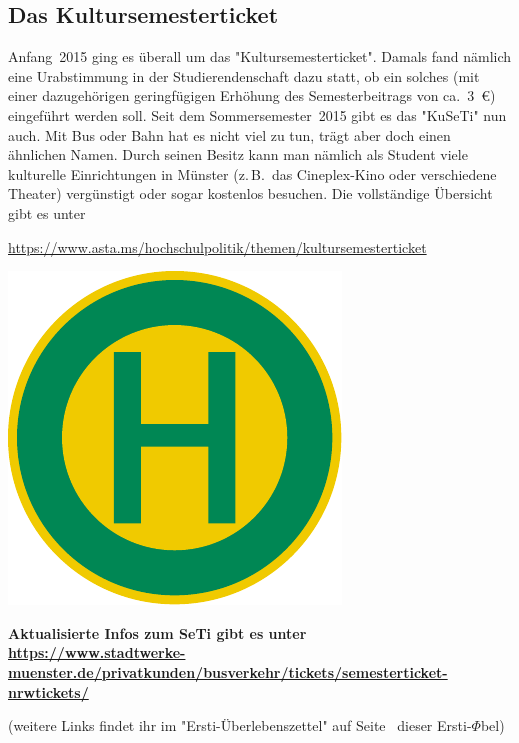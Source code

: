 \begin{multicols*}{2}
\subsection{Das Kultursemesterticket}
Anfang~2015 ging es überall um das "Kultursemesterticket".
Damals fand nämlich eine Urabstimmung in der Studierendenschaft dazu statt, ob ein solches (mit einer dazugehörigen geringfügigen Erhöhung des Semesterbeitrags von ca.\ \SI{3}{\euro}) eingeführt werden soll.
Seit dem Sommersemester~2015 gibt es das "KuSeTi" nun auch.
Mit Bus oder Bahn hat es nicht viel zu tun, trägt aber doch einen ähnlichen Namen.
Durch seinen Besitz kann man nämlich als Student viele kulturelle Einrichtungen in Münster (z.\,B.\ das Cineplex-Kino oder verschiedene Theater) vergünstigt oder sogar kostenlos besuchen.
Die vollständige Übersicht gibt es unter
\vspace{-1ex}
\begin{center}
	\url{https://www.asta.ms/hochschulpolitik/themen/kultursemesterticket}
\end{center}

\smallskip

\begin{center}
	\includegraphics[width=\columnwidth, height=0.14\textheight]{res/bushaltestelle.pdf}

	{\bfseries
	Aktualisierte Infos zum SeTi gibt es unter\\
	\url{https://www.stadtwerke-muenster.de/privatkunden/busverkehr/tickets/semesterticket-nrwtickets/}}
	
	(weitere Links findet ihr im "Ersti-Überlebenszettel" auf Seite~\pageref{dpü} dieser Ersti-$\Phi$bel)
\end{center}

\end{multicols*}
